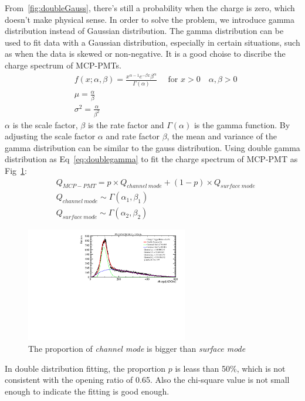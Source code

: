 \documentclass{article}
\begin{document}
From~\ref{fig:doubleGauss}, there's still a probability when the charge is zero, which doesn't make physical sense.
In order to solve the problem, we introduce gamma distribution instead of Gaussian distribution. 
The gamma distribution can be used to fit data with a Gaussian distribution, especially in certain situations, 
such as when the data is skewed or non-negative. It is a good choise to discribe the charge spectrum of MCP-PMTs.    
\begin{equation}
    \label{eq:gamma}
    \begin{aligned}
        &f(x ; \alpha, \beta)=\frac{x^{\alpha-1} e^{-\beta x} \beta^\alpha}{\Gamma(\alpha)} \quad \text { for } x>0 \quad \alpha, \beta>0\\
        &\mu=\frac{\alpha}{\beta}\\
        &\sigma^2=\frac{\alpha}{\beta^2}
    \end{aligned}    
\end{equation}
$\alpha$ is the scale factor, $\beta$ is the rate factor and $\Gamma(\alpha)$ is the gamma function.
By adjusting the scale factor $\alpha$ and rate factor $\beta$, the mean and variance of the gamma distribution can be similar to the gauss distribution.
Using double gamma distribution as Eq~\ref{eq:doublegamma} to fit the charge spectrum of MCP-PMT as Fig~\ref{fig:doubleGamma}:
\begin{equation}
    \label{eq:doublegamma}
    \begin{aligned}
         & Q_{MCP-PMT} = p\times Q_{channel\  mode} + (1-p)\times Q_{surface\  mode} \\
         & Q_{channel\  mode} \sim \varGamma  (\alpha_1, \beta_1)                      \\
         & Q_{surface\  mode} \sim \varGamma  (\alpha_2, \beta_2)
    \end{aligned}
\end{equation}
\begin{figure}[ht]
    \centering
    \includegraphics[height=5cm]{pic/doubleGamma.pdf}
    \caption{The proportion of \textit{channel mode} is bigger than \textit{surface mode}}\label{fig:doubleGamma}
\end{figure}
In double distribution fitting, the proportion $p$ is leass than 50\%, which is not consistent with the opening ratio of 0.65.
Also the chi-square value is not small enough to indicate the fitting is good enough.
\end{document}
